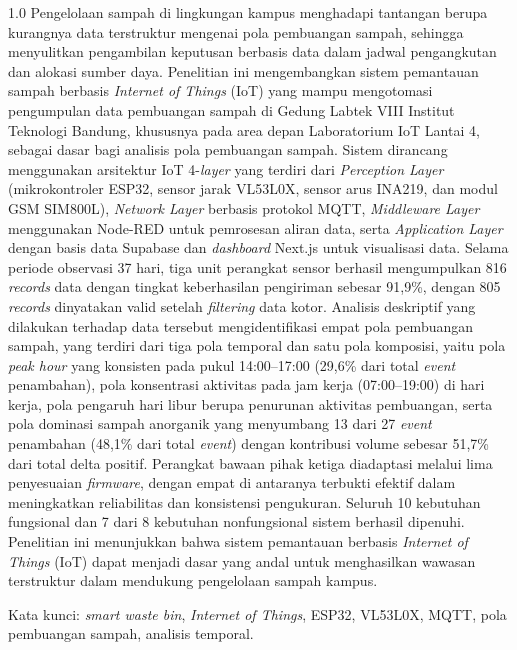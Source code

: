 \begin{spacing}{1.0}
Pengelolaan sampah di lingkungan kampus menghadapi tantangan berupa kurangnya data terstruktur mengenai pola pembuangan sampah, sehingga menyulitkan pengambilan keputusan berbasis data dalam jadwal pengangkutan dan alokasi sumber daya. Penelitian ini mengembangkan sistem pemantauan sampah berbasis \textit{Internet of Things} (IoT) yang mampu mengotomasi pengumpulan data pembuangan sampah di Gedung Labtek VIII Institut Teknologi Bandung, khususnya pada area depan Laboratorium IoT Lantai 4, sebagai dasar bagi analisis pola pembuangan sampah. Sistem dirancang menggunakan arsitektur IoT 4-\textit{layer} yang terdiri dari \textit{Perception Layer} (mikrokontroler ESP32, sensor jarak VL53L0X, sensor arus INA219, dan modul GSM SIM800L), \textit{Network Layer} berbasis protokol MQTT, \textit{Middleware Layer} menggunakan Node-RED untuk pemrosesan aliran data, serta \textit{Application Layer} dengan basis data Supabase dan \textit{dashboard} Next.js untuk visualisasi data. Selama periode observasi 37 hari, tiga unit perangkat sensor berhasil mengumpulkan 816 \textit{records} data dengan tingkat keberhasilan pengiriman sebesar 91,9\%, dengan 805 \textit{records} dinyatakan valid setelah \textit{filtering} data kotor. Analisis deskriptif yang dilakukan terhadap data tersebut mengidentifikasi empat pola pembuangan sampah, yang terdiri dari tiga pola temporal dan satu pola komposisi, yaitu pola \textit{peak hour} yang konsisten pada pukul 14:00--17:00 (29,6\% dari total \textit{event} penambahan), pola konsentrasi aktivitas pada jam kerja (07:00--19:00) di hari kerja, pola pengaruh hari libur berupa penurunan aktivitas pembuangan, serta pola dominasi sampah anorganik yang menyumbang 13 dari 27 \textit{event} penambahan (48,1\% dari total \textit{event}) dengan kontribusi volume sebesar 51,7\% dari total delta positif. Perangkat bawaan pihak ketiga diadaptasi melalui lima penyesuaian \textit{firmware}, dengan empat di antaranya terbukti efektif dalam meningkatkan reliabilitas dan konsistensi pengukuran. Seluruh 10 kebutuhan fungsional dan 7 dari 8 kebutuhan nonfungsional sistem berhasil dipenuhi. Penelitian ini menunjukkan bahwa sistem pemantauan berbasis \textit{Internet of Things} (IoT) dapat menjadi dasar yang andal untuk menghasilkan wawasan terstruktur dalam mendukung pengelolaan sampah kampus.

Kata kunci: \textit{smart waste bin}, \textit{Internet of Things}, ESP32, VL53L0X, MQTT, pola pembuangan sampah, analisis temporal.
\end{spacing}